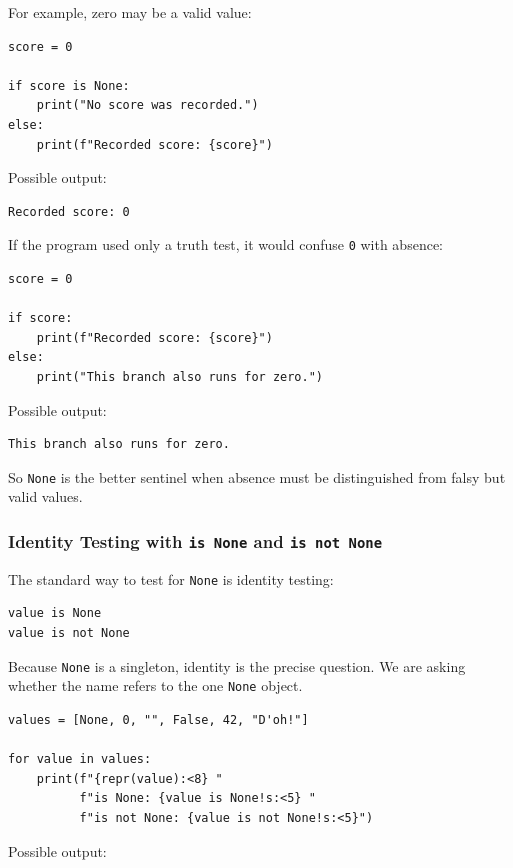 For example, zero may be a valid value:

\begin{verbatim}
score = 0

if score is None:
    print("No score was recorded.")
else:
    print(f"Recorded score: {score}")
\end{verbatim}

Possible output:

\begin{verbatim}
Recorded score: 0
\end{verbatim}

If the program used only a truth test, it would confuse \texttt{0} with absence:

\begin{verbatim}
score = 0

if score:
    print(f"Recorded score: {score}")
else:
    print("This branch also runs for zero.")
\end{verbatim}

Possible output:

\begin{verbatim}
This branch also runs for zero.
\end{verbatim}

So \texttt{None} is the better sentinel when absence must be distinguished from falsy but valid values.

\subsubsection{Identity Testing with \texttt{is None} and \texttt{is not None}}

The standard way to test for \texttt{None} is identity testing:

\begin{verbatim}
value is None
value is not None
\end{verbatim}

Because \texttt{None} is a singleton, identity is the precise question. We are asking whether the name refers to the one \texttt{None} object.

\begin{verbatim}
values = [None, 0, "", False, 42, "D'oh!"]

for value in values:
    print(f"{repr(value):<8} "
          f"is None: {value is None!s:<5} "
          f"is not None: {value is not None!s:<5}")
\end{verbatim}

Possible output:

